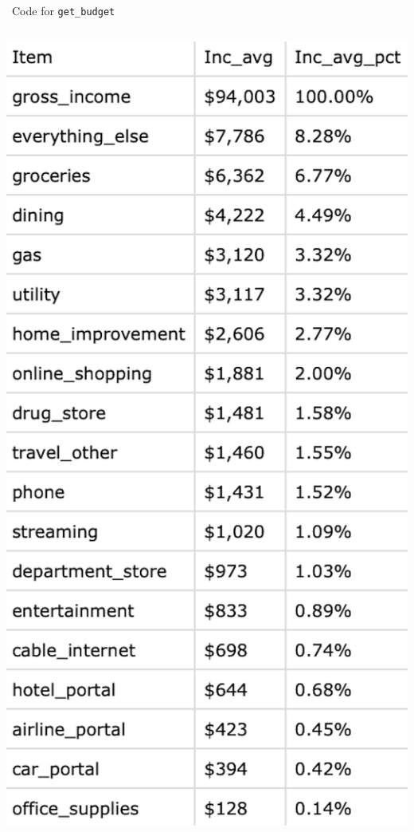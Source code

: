 \begin{frame}{\sR\ Code for \texttt{get\_budget}}
\begin{columns}[c]
\begin{column}{0.3\textwidth}
                    \includegraphics[height=0.8\textheight]{../Misc/RCode_budget2.png}
            \end{column}
        \end{columns}
\end{frame} 

